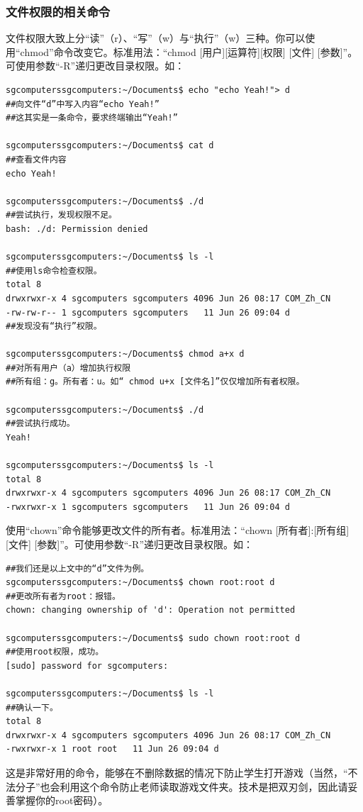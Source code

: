 \documentclass{book}
\begin{document}
\subsubsection{文件权限的相关命令}
文件权限大致上分“读”（r）、“写”（w）与“执行”（w）三种。你可以使用“chmod”命令改变它。标准用法：“chmod [用户][运算符][权限] [文件] [参数]”。可使用参数“-R”递归更改目录权限。如：
\begin{verbatim}
sgcomputerssgcomputers:~/Documents$ echo "echo Yeah!"> d
##向文件“d”中写入内容“echo Yeah!”
##这其实是一条命令，要求终端输出“Yeah!”

sgcomputerssgcomputers:~/Documents$ cat d
##查看文件内容
echo Yeah!

sgcomputerssgcomputers:~/Documents$ ./d
##尝试执行，发现权限不足。
bash: ./d: Permission denied

sgcomputerssgcomputers:~/Documents$ ls -l
##使用ls命令检查权限。
total 8
drwxrwxr-x 4 sgcomputers sgcomputers 4096 Jun 26 08:17 COM_Zh_CN
-rw-rw-r-- 1 sgcomputers sgcomputers   11 Jun 26 09:04 d
##发现没有“执行”权限。

sgcomputerssgcomputers:~/Documents$ chmod a+x d
##对所有用户（a）增加执行权限
##所有组：g。所有者：u。如“ chmod u+x [文件名]”仅仅增加所有者权限。

sgcomputerssgcomputers:~/Documents$ ./d
##尝试执行成功。
Yeah!

sgcomputerssgcomputers:~/Documents$ ls -l
total 8
drwxrwxr-x 4 sgcomputers sgcomputers 4096 Jun 26 08:17 COM_Zh_CN
-rwxrwxr-x 1 sgcomputers sgcomputers   11 Jun 26 09:04 d

\end{verbatim}
使用“chown”命令能够更改文件的所有者。标准用法：“chown [所有者]:[所有组] [文件] [参数]”。可使用参数“-R”递归更改目录权限。如：
\begin{verbatim}
##我们还是以上文中的“d”文件为例。
sgcomputerssgcomputers:~/Documents$ chown root:root d
##更改所有者为root：报错。
chown: changing ownership of 'd': Operation not permitted

sgcomputerssgcomputers:~/Documents$ sudo chown root:root d
##使用root权限，成功。
[sudo] password for sgcomputers: 

sgcomputerssgcomputers:~/Documents$ ls -l
##确认一下。
total 8
drwxrwxr-x 4 sgcomputers sgcomputers 4096 Jun 26 08:17 COM_Zh_CN
-rwxrwxr-x 1 root root   11 Jun 26 09:04 d
\end{verbatim}
这是非常好用的命令，能够在不删除数据的情况下防止学生打开游戏（当然，“不法分子”也会利用这个命令防止老师读取游戏文件夹。技术是把双刃剑，因此请妥善掌握你的root密码）。
\end{document}
